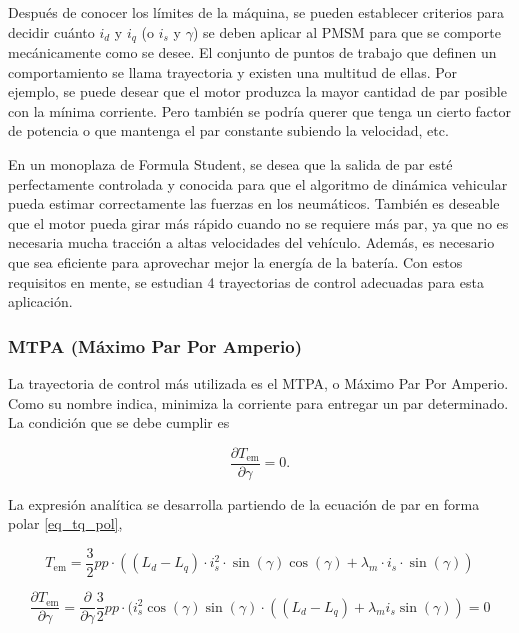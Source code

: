 Después de conocer los límites de la máquina, se pueden establecer criterios para decidir cuánto \(i_d\) y \(i_q\) (o \(i_s\) y \(\gamma\)) se deben aplicar al PMSM para que se comporte mecánicamente como se desee. El conjunto de puntos de trabajo que definen un comportamiento se llama trayectoria y existen una multitud de ellas. Por ejemplo, se puede desear que el motor produzca la mayor cantidad de par posible con la mínima corriente. Pero también se podría querer que tenga un cierto factor de potencia o que mantenga el par constante subiendo la velocidad, etc.

En un monoplaza de Formula Student, se desea que la salida de par esté perfectamente controlada y conocida para que el algoritmo de dinámica vehicular pueda estimar correctamente las fuerzas en los neumáticos. También es deseable que el motor pueda girar más rápido cuando no se requiere más par, ya que no es necesaria mucha tracción a altas velocidades del vehículo. Además, es necesario que sea eficiente para aprovechar mejor la energía de la batería. Con estos requisitos en mente, se estudian 4 trayectorias de control adecuadas para esta aplicación.

\subsubsection{MTPA (Máximo Par Por Amperio)}

La trayectoria de control más utilizada es el MTPA, o Máximo Par Por Amperio. Como su nombre indica, minimiza la corriente para entregar un par determinado. La condición que se debe cumplir es

\begin{equation}
	\frac{\partial T_{\text{em}}}{\partial \gamma} = 0 \text{.}
\end{equation}


La expresión analítica se desarrolla partiendo de la ecuación de par en forma polar \ref{eq_tq_pol},

\begin{equation*}
	T_{\text{em}} = \frac{3}{2}pp\cdot((L_d - L_q)\cdot i_s^2 \cdot \sin(\gamma)\cos(\gamma) + \lambda_m\cdot i_s\cdot \sin(\gamma))
\end{equation*}


\begin{equation}
\frac{\partial T_{\text{em}}}{\partial \gamma} = \frac{\partial}{\partial \gamma} \frac{3}{2}pp\cdot(i_s^2 \cos(\gamma)\sin(\gamma)\cdot((L_d - L_q) + \lambda_m i_s \sin(\gamma)) = 0
\end{equation}

